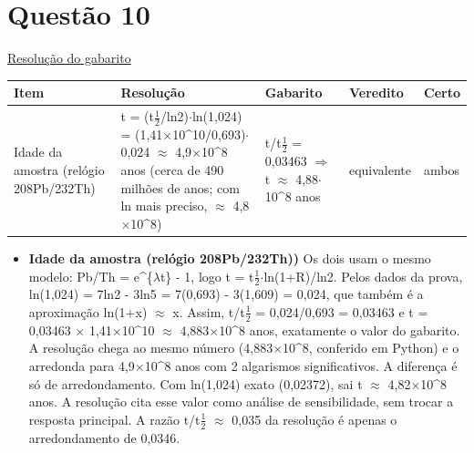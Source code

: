 \documentclass{article}%
\begin{document}
\section*{Questão 10}%
\href{https://poliedroresolve.sistemapoliedro.com.br/vestibulares/ime/2027/ime-2-fase-dia-3-28-10-2026-2-fase-dia-3/dissertativa-10-quimica-2-fase-dia-3-ime-2027}{Resolução do gabarito}\par\smallskip%
\begin{longtable}{@{}p{} p{} p{} p{} p{}@{}}\toprule Item & Resolução & Gabarito & Veredito & Certo \\ \midrule
Idade da amostra (relógio 208Pb/232Th) & t = (t$\frac12$/ln2)$\cdot$ln(1,024) = (1,41$\times$10\^{}10/0,693)$\cdot$0,024 $\approx$ 4,9$\times$10\^{}8 anos (cerca de 490 milhões de anos; com ln mais preciso, $\approx$ 4,8$\times$10\^{}8) & t/t$\frac12$ = 0,03463 $\Rightarrow$ t $\approx$ 4,88$\cdot$10\^{}8 anos & equivalente & ambos \\
\bottomrule\end{longtable}%
\begin{itemize}%
\item%
\textbf{Idade da amostra (relógio 208Pb/232Th))} Os dois usam o mesmo modelo: Pb/Th = e\^{}\{$\lambda$t\} - 1, logo t = t$\frac12$$\cdot$ln(1+R)/ln2. Pelos dados da prova, ln(1,024) = 7ln2 - 3ln5 = 7(0,693) - 3(1,609) = 0,024, que também é a aproximação ln(1+x) $\approx$ x. Assim, t/t$\frac12$ = 0,024/0,693 = 0,03463 e t = 0,03463 $\times$ 1,41$\times$10\^{}10 $\approx$ 4,883$\times$10\^{}8 anos, exatamente o valor do gabarito. A resolução chega ao mesmo número (4,883$\times$10\^{}8, conferido em Python) e o arredonda para 4,9$\times$10\^{}8 anos com 2 algarismos significativos. A diferença é só de arredondamento. Com ln(1,024) exato (0,02372), sai t $\approx$ 4,82$\times$10\^{}8 anos. A resolução cita esse valor como análise de sensibilidade, sem trocar a resposta principal. A razão t/t$\frac12$ $\approx$ 0,035 da resolução é apenas o arredondamento de 0,0346.%
\end{itemize}%
\end{document}
